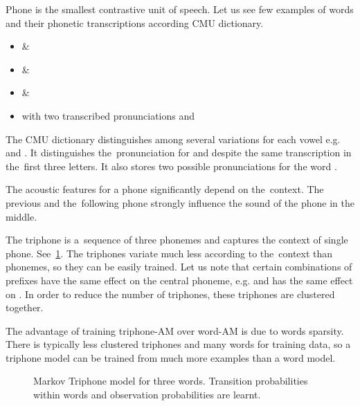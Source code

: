 {
Phone is the smallest contrastive unit of speech. 
Let us see few examples of words and their phonetic transcriptions according CMU dictionary\cite{weide1998cmu}.
\begin{itemize}
    \item {} \& 
    \item {} \& 
    \item {} \& 
    \item {} with two transcribed pronunciations  and 
\end{itemize}
The CMU dictionary distinguishes among several variations for each vowel e.g.  and .
It distinguishes the~pronunciation for  and 
despite the same transcription in the~first three letters.
It also stores two possible pronunciations for the word .

The acoustic features for a phone significantly depend on the~context.
The previous and the~following phone strongly influence the sound of the phone in the middle.

The triphone is a~sequence of three phonemes and captures the context of single phone.
See~\ref{fig:hmm_words}.
The triphones variate much less according to the~context than phonemes, so they can be easily trained.
Let us note that certain combinations of prefixes have the same effect on the central phoneme,
e.g.  and  has the same effect on . %
In order to reduce the number of triphones, these triphones are clustered together.

The advantage of training triphone-\ac{AM} over word-\ac{AM} 
is due to words sparsity. 
There is typically less clustered triphones and many words for training data,
so a triphone model can be trained from much more examples than a word model. 


\begin{figure}[!htp]
    \begin{center}
    
    \caption{Markov Triphone model for three words. Transition probabilities within
    words and observation probabilities are learnt.}
    \label{fig:hmm_words} 
    \end{center}
\end{figure}


}
